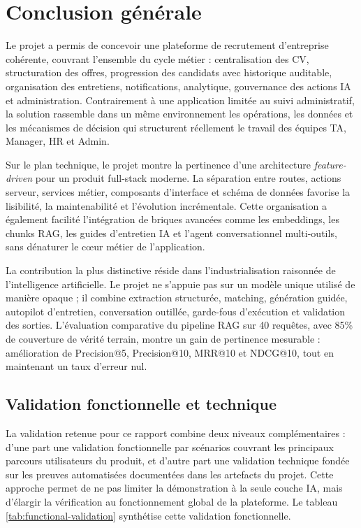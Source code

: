 \chapter*{Conclusion générale}

Le projet \projectname{} a permis de concevoir une plateforme de recrutement d'entreprise cohérente, couvrant l'ensemble du cycle métier : centralisation des CV, structuration des offres, progression des candidats avec historique auditable, organisation des entretiens, notifications, analytique, gouvernance des actions IA et administration. Contrairement à une application limitée au suivi administratif, la solution rassemble dans un même environnement les opérations, les données et les mécanismes de décision qui structurent réellement le travail des équipes TA, Manager, HR et Admin.

Sur le plan technique, le projet montre la pertinence d'une architecture \textit{feature-driven} pour un produit full-stack moderne. La séparation entre routes, actions serveur, services métier, composants d'interface et schéma de données favorise la lisibilité, la maintenabilité et l'évolution incrémentale. Cette organisation a également facilité l'intégration de briques avancées comme les embeddings, les chunks RAG, les guides d'entretien IA et l'agent conversationnel multi-outils, sans dénaturer le c\oe{}ur métier de l'application.

La contribution la plus distinctive réside dans l'industrialisation raisonnée de l'intelligence artificielle. Le projet ne s'appuie pas sur un modèle unique utilisé de manière opaque ; il combine extraction structurée, matching, génération guidée, autopilot d'entretien, conversation outillée, garde-fous d'exécution et validation des sorties. L'évaluation comparative du pipeline RAG sur 40 requêtes, avec 85\% de couverture de vérité terrain, montre un gain de pertinence mesurable : amélioration de Precision@5, Precision@10, MRR@10 et NDCG@10, tout en maintenant un taux d'erreur nul.

\section*{Validation fonctionnelle et technique}
La validation retenue pour ce rapport combine deux niveaux complémentaires : d'une part une validation fonctionnelle par scénarios couvrant les principaux parcours utilisateurs du produit, et d'autre part une validation technique fondée sur les preuves automatisées documentées dans les artefacts du projet. Cette approche permet de ne pas limiter la démonstration à la seule couche IA, mais d'élargir la vérification au fonctionnement global de la plateforme. Le tableau \ref{tab:functional-validation} synthétise cette validation fonctionnelle.

